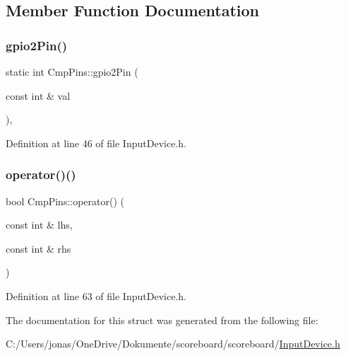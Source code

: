 \subsection{Member Function Documentation}
\mbox{\label{struct_cmp_pins_ae0dd767a616074a3d053b0d7018f411d}} 
\subsubsection{\texorpdfstring{gpio2\+Pin()}{gpio2Pin()}}
{\footnotesize\ttfamily static int Cmp\+Pins\+::gpio2\+Pin (\begin{DoxyParamCaption}\item[{const int \&}]{val }\end{DoxyParamCaption})\hspace{0.3cm}{\ttfamily [inline]}, {\ttfamily [static]}}



Definition at line 46 of file Input\+Device.\+h.

\mbox{\label{struct_cmp_pins_aa746fa4480accb4564e3dfe8c87fd230}} 
\subsubsection{\texorpdfstring{operator()()}{operator()()}}
{\footnotesize\ttfamily bool Cmp\+Pins\+::operator() (\begin{DoxyParamCaption}\item[{const int \&}]{lhs,  }\item[{const int \&}]{rhs }\end{DoxyParamCaption})\hspace{0.3cm}{\ttfamily [inline]}}



Definition at line 63 of file Input\+Device.\+h.



The documentation for this struct was generated from the following file\+:\begin{DoxyCompactItemize}
\item 
C\+:/\+Users/jonas/\+One\+Drive/\+Dokumente/scoreboard/scoreboard/\hyperlink{_input_device_8h}{Input\+Device.\+h}\end{DoxyCompactItemize}
